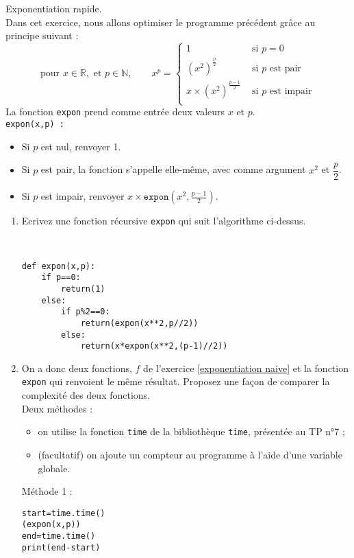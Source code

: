 \begin{exercice}\label{exp rapide}Exponentiation rapide.\\
Dans cet exercice, nous allons optimiser le programme précédent grâce au principe suivant :
\[\text{pour }x\in\mathbb{R},\text{ et }p\in \mathbb{N},\qquad x^p=\left\lbrace
\begin{array}{ll}
1&\text{ si }p=0\\
\left(x^2\right)^{\frac{p}{2}}&\text{ si }p\text{ est pair}\\
x\times \left(x^2\right)^{\frac{p-1}{2}}&\text{ si }p\text{ est impair}\\
\end{array}\right.\]
La fonction \verb?expon? prend comme entrée deux valeurs $x$ et $p$.\\
\verb?expon(x,p) : ?
\begin{itemize}
\item Si $p$ est nul, renvoyer 1.
\item Si $p$ est pair, la fonction s'appelle elle-même, avec comme argument $x^2$ et $\dfrac{p}{2}$.
\item Si $p$ est impair, renvoyer $x\times \texttt{expon}(x^2,\frac{p-1}{2})$.
\end{itemize}
\begin{enumerate}
\item Ecrivez une fonction récursive \verb?expon? qui suit l'algorithme ci-dessus.
\begin{solution}~\\
\vspace{-0.7cm}
\begin{verbatim}
def expon(x,p):
    if p==0:
        return(1)
    else:
        if p%2==0:
            return(expon(x**2,p//2))
        else:
            return(x*expon(x**2,(p-1)//2))
\end{verbatim}
\end{solution}
\item On a donc deux fonctions, $f$ de l'exercice \ref{exponentiation naive} et la fonction \verb?expon? qui renvoient le même résultat. Proposez une façon de comparer la complexité des deux fonctions. \\
Deux méthodes :
\begin{itemize}
\item on utilise la fonction \verb?time? de la bibliothèque \verb?time?, présentée au TP n°7 ;
\item (facultatif) on ajoute un compteur au programme à l'aide d'une variable globale.
\end{itemize} 
\begin{solution}
\newpage
Méthode 1 :\\
\begin{verbatim}
start=time.time()
(expon(x,p))
end=time.time()
print(end-start)
        

\end{verbatim}
\end{solution}
\end{enumerate}
\end{exercice}
